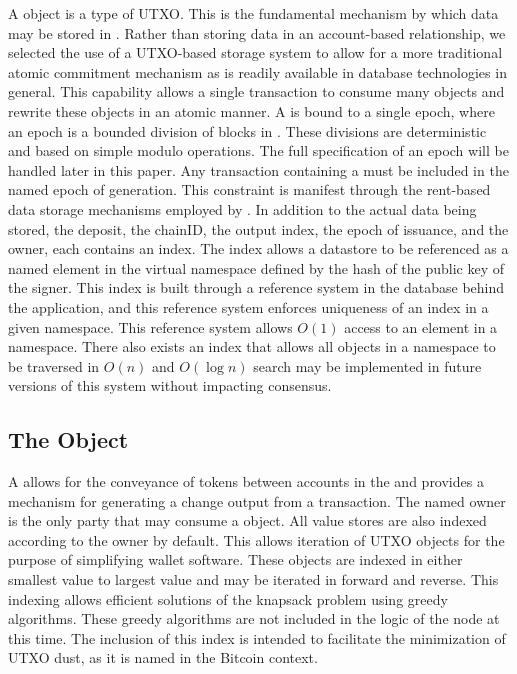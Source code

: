 A \DataStore{} object is a type of UTXO.
This is the fundamental mechanism by which data may be stored in
\LayerTwo{}.
Rather than storing data in an account-based relationship, we selected
the use of a UTXO-based storage system to allow for a more traditional
atomic commitment mechanism as is readily available in database
technologies in general.
This capability allows a single transaction to consume many \DataStore{}
objects and rewrite these objects in an atomic manner.
A \DataStore{} is bound to a single epoch, where an epoch is a bounded
division of blocks in \LayerTwo{}.
These divisions are deterministic and based on simple modulo operations.
The full specification of an epoch will be handled later in this paper.
Any transaction containing a \DataStore{} must be included in the named
epoch of generation.
This constraint is manifest through the rent-based data storage
mechanisms employed by \LayerTwo{}.
In addition to the actual data being stored, the deposit, the chainID,
the output index, the epoch of issuance, and the owner, each \DataStore{} contains
an index.
The index allows a datastore to be referenced as a named element in the
virtual namespace defined by the hash of the public key of the
\DataStore{} signer.
This index is built through a reference system in the database behind
the application, and this reference system enforces uniqueness of an
index in a given namespace.
This reference system allows $O(1)$ access to an element in a namespace.
There also exists an index that allows all objects in a namespace to be
traversed in $O(n)$ and $O(\log n)$ search may be implemented in future
versions of this system without impacting consensus.


\subsection{The \ValueStore{} Object}



A \ValueStore{} allows for the conveyance of \LayerTwo{} tokens between
accounts in the \LayerTwo{} and provides a mechanism for generating a
change output from a transaction.
The named owner is the only party that may consume a \ValueStore{} object.
All value stores are also indexed according to the owner by default.
This allows iteration of UTXO objects for the purpose of simplifying
wallet software.
These objects are indexed in either smallest value to largest value and
may be iterated in forward and reverse.
This indexing allows efficient solutions of the knapsack problem using
greedy algorithms.
These greedy algorithms are not included in the logic of the node at
this time.
The inclusion of this index is intended to facilitate the minimization
of UTXO dust, as it is named in the Bitcoin context.


